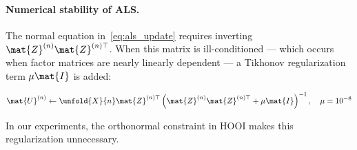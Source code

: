       \paragraph{Numerical stability of ALS.}
        The normal equation in~\eqref{eq:als_update} requires inverting $\mat{Z}^{(n)} \mat{Z}^{(n)\top}$. When this matrix is ill-conditioned --- which occurs when factor matrices are nearly linearly dependent --- a Tikhonov regularization term $\mu \mat{I}$ is added:

        \begin{equation}
          \mat{U}^{(n)} \leftarrow
          \unfold{X}{n} \mat{Z}^{(n)\top} \left(\mat{Z}^{(n)} \mat{Z}^{(n)\top} + \mu \mat{I}\right)^{-1}, \quad \mu = 10^{-8}
        \end{equation}

        In our experiments, the orthonormal constraint in HOOI makes this regularization unnecessary.\\






